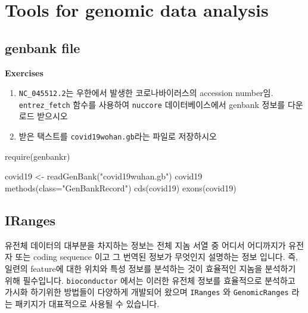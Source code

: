 \documentclass[
]{book}
\newenvironment{Shaded}{\begin{snugshade}}{\end{snugshade}}
\newcommand{\AttributeTok}[1]{\textcolor[rgb]{0.77,0.63,0.00}{#1}}
\newcommand{\FunctionTok}[1]{\textcolor[rgb]{0.00,0.00,0.00}{#1}}
\newcommand{\NormalTok}[1]{#1}
\newcommand{\OtherTok}[1]{\textcolor[rgb]{0.56,0.35,0.01}{#1}}
\newcommand{\StringTok}[1]{\textcolor[rgb]{0.31,0.60,0.02}{#1}}
\begin{document}
\hypertarget{tools-for-genomic-data-analysis}{%
\chapter{Tools for genomic data analysis}\label{tools-for-genomic-data-analysis}}

\hypertarget{genbank-file}{%
\section{genbank file}\label{genbank-file}}

\textbf{Exercises }

\begin{enumerate}
\def\labelenumi{\arabic{enumi}.}
\item
  \texttt{NC\_045512.2}는 우한에서 발생한 코로나바이러스의 accession number임. \texttt{entrez\_fetch} 함수를 사용하여 \texttt{nuccore} 데이터베이스에서 genbank 정보를 다운로드 받으시오
\item
  받은 택스트를 \texttt{covid19wohan.gb}라는 파일로 저장하시오
\end{enumerate}

\begin{Shaded}
\begin{Highlighting}[]
\FunctionTok{require}\NormalTok{(genbankr)}

\NormalTok{covid19 }\OtherTok{\textless{}{-}} \FunctionTok{readGenBank}\NormalTok{(}\StringTok{"covid19wuhan.gb"}\NormalTok{)}
\NormalTok{covid19}
\FunctionTok{methods}\NormalTok{(}\AttributeTok{class=}\StringTok{"GenBankRecord"}\NormalTok{)}
\FunctionTok{cds}\NormalTok{(covid19)}
\FunctionTok{exons}\NormalTok{(covid19)}
\end{Highlighting}
\end{Shaded}

\hypertarget{iranges}{%
\section{IRanges}\label{iranges}}

유전체 데이터의 대부분을 차지하는 정보는 전체 지놈 서열 중 어디서 어디까지가 유전자 또는 coding sequence 이고 그 번역된 정보가 무엇인지 설명하는 정보 입니다. 즉, 일련의 feature에 대한 위치와 특성 정보를 분석하는 것이 효율적인 지놈을 분석하기 위해 필수입니다. \texttt{bioconductor} 에서는 이러한 유전체 정보를 효율적으로 분석하고 가시화 하기위한 방법들이 다양하게 개발되어 왔으며 \texttt{IRanges} 와 \texttt{GenomicRanges} 라는 패키지가 대표적으로 사용될 수 있습니다.
\end{document}
